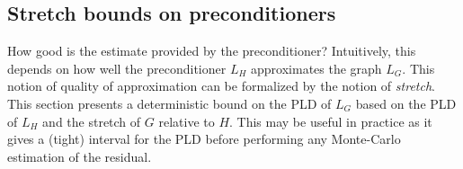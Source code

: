 


\subsection{Stretch bounds on preconditioners\label{sub:Stretch-bounds}}

How good is the estimate provided by the preconditioner? Intuitively,
this depends on how well the preconditioner $L_{H}$ approximates
the graph $L_{G}$. This notion of quality of approximation can be
formalized by the notion of \emph{stretch}. This section presents
a deterministic bound on the PLD of $L_{G}$ based on the PLD of $L_{H}$
and the stretch of $G$ relative to $H$. This may be useful in practice
as it gives a (tight) interval for the PLD before performing any Monte-Carlo
estimation of the residual.

